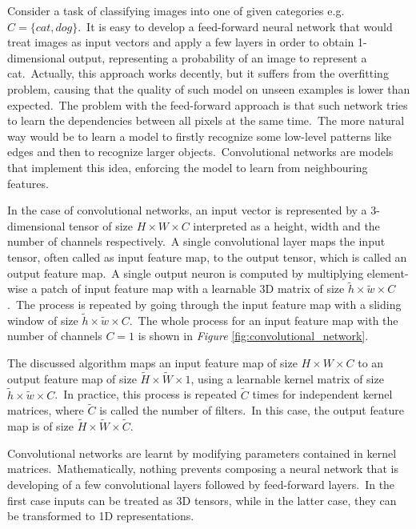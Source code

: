 \documentclass[longabstract, english, mgr]{iithesis}
\theoremstyle{default_theorem_style}\newtheorem{theorem}{Theorem}
\theoremstyle{default_theorem_style}\newtheorem{definition}{Definition}
\begin{document}
Consider a task of classifying images into one of given categories e.g.\ $C = \{cat, dog\}$.\ It is easy to develop
a feed-forward neural network that would treat images as input vectors and apply a few layers in order to obtain
1-dimensional output, representing a probability of an image to represent a cat.\ Actually, this approach works
decently, but it suffers from the overfitting problem, causing that the quality of such model on unseen examples is
lower than expected.\ The problem with the feed-forward approach is that such network tries to learn the dependencies
between all pixels at the same time.\ The more natural way would be to learn a model to firstly recognize some
low-level patterns like edges and then to recognize larger objects.\ Convolutional networks are models that implement
this idea, enforcing the model to learn from neighbouring features.\newline

\noindent In the case of convolutional networks, an input vector is represented by a 3-dimensional tensor of size
$H \times W \times C$ interpreted as a height, width and  the number of channels respectively.\ A single convolutional
layer maps the input tensor, often called as input feature map, to the output tensor, which is called an output
feature map.\ A single output neuron is computed by multiplying element-wise a patch of input feature map with
a learnable 3D matrix of size $\tilde{h} \times \tilde{w} \times C$.\ The process is repeated by going through the
input feature map with a sliding window of size $\tilde{h} \times \tilde{w} \times C$.\ The whole process for an input
feature map with the number of channels $C = 1$ is shown in \textit{Figure} \ref{fig:convolutional_network}.\newline

\noindent The discussed algorithm maps an input feature map of size $H \times W \times C$ to an output feature map of
size $\tilde{H} \times \tilde{W} \times 1$, using a learnable kernel matrix of size
$\tilde{h} \times \tilde{w} \times C$.\ In practice, this process is repeated $\tilde{C}$ times for independent
kernel matrices, where $\tilde{C}$ is called the number of filters.\ In this case, the output feature map is of size
$\tilde{H} \times \tilde{W} \times \tilde{C}$.\newline

\noindent Convolutional networks are learnt by modifying parameters contained in kernel matrices.\ Mathematically,
nothing prevents composing a neural network that is developing of a few convolutional layers followed by feed-forward
layers.\ In the first case inputs can be treated as 3D tensors, while in the latter case, they can be transformed
to 1D representations.
\end{document}
